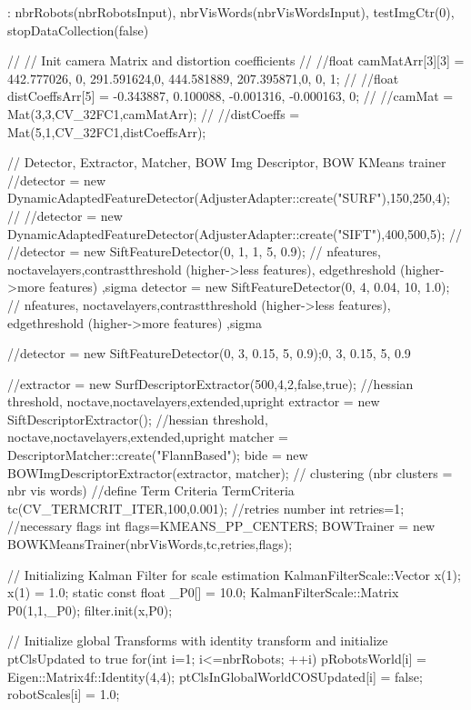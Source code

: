 \begin{DoxyCode}
                                                                       :
                nbrRobots(nbrRobotsInput),
                nbrVisWords(nbrVisWordsInput),
                testImgCtr(0),
                stopDataCollection(false)
                {
//      // Init camera Matrix and distortion coefficients
//      //float camMatArr[3][3] = {{442.777026, 0, 291.591624},{0, 444.581889,
       207.395871},{0, 0, 1}};
//      //float distCoeffsArr[5] = {-0.343887, 0.100088, -0.001316, -0.000163,
       0};
//      //camMat = Mat(3,3,CV_32FC1,camMatArr);
//      //distCoeffs = Mat(5,1,CV_32FC1,distCoeffsArr);



        // Detector, Extractor, Matcher, BOW Img Descriptor, BOW KMeans trainer
    //detector = new
       DynamicAdaptedFeatureDetector(AdjusterAdapter::create("SURF"),150,250,4); //
        //detector = new
       DynamicAdaptedFeatureDetector(AdjusterAdapter::create("SIFT"),400,500,5); //
        //detector = new SiftFeatureDetector(0, 1, 1, 5, 0.9); // nfeatures,
       noctavelayers,contrastthreshold (higher->less features), edgethreshold
       (higher->more features) ,sigma
        detector = new SiftFeatureDetector(0, 4, 0.04, 10, 1.0); // nfeatures,
       noctavelayers,contrastthreshold (higher->less features), edgethreshold
       (higher->more features) ,sigma

//detector = new SiftFeatureDetector(0, 3, 0.15, 5, 0.9);0, 3, 0.15, 5, 0.9

        //extractor = new SurfDescriptorExtractor(500,4,2,false,true);
       //hessian threshold, noctave,noctavelayers,extended,upright
        extractor = new SiftDescriptorExtractor(); //hessian threshold,
       noctave,noctavelayers,extended,upright
        matcher = DescriptorMatcher::create("FlannBased");
        bide =  new BOWImgDescriptorExtractor(extractor, matcher);
        // clustering (nbr clusters = nbr vis words)
        //define Term Criteria
        TermCriteria tc(CV_TERMCRIT_ITER,100,0.001);
        //retries number
        int retries=1;
        //necessary flags
        int flags=KMEANS_PP_CENTERS;
        BOWTrainer = new BOWKMeansTrainer(nbrVisWords,tc,retries,flags);

        // Initializing Kalman Filter for scale estimation
        KalmanFilterScale::Vector x(1);
        x(1) = 1.0;
        static const float _P0[] = {10.0};
        KalmanFilterScale::Matrix P0(1,1,_P0);
        filter.init(x,P0);

        // Initialize global Transforms with identity transform and initialize
       ptClsUpdated to true
        for(int i=1; i<=nbrRobots; ++i) {
                pRobotsWorld[i] = Eigen::Matrix4f::Identity(4,4);
                ptClsInGlobalWorldCOSUpdated[i] = false;
                robotScales[i] = 1.0;
        }

}
\end{DoxyCode}
